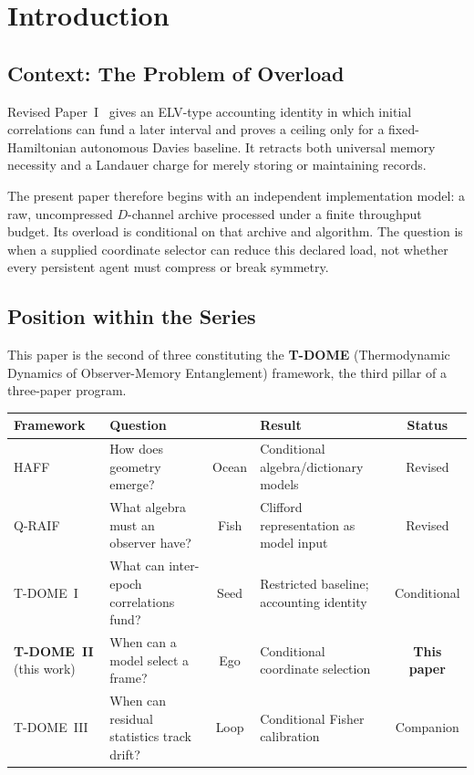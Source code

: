 \documentclass[12pt,a4paper,openany]{book}
\begin{document}
\section{Introduction}
\label{II-sec:intro}

\subsection{Context: The Problem of Overload}
\label{II-subsec:overload}

Revised Paper~I~\cite{Liu2026TDOME_I} gives an ELV-type
accounting identity in which initial correlations can fund a later
interval and proves a ceiling only for a fixed-Hamiltonian autonomous
Davies baseline.  It retracts both universal memory necessity and a
Landauer charge for merely storing or maintaining records.

The present paper therefore begins with an independent implementation
model: a raw, uncompressed $D$-channel archive processed under a finite
throughput budget.  Its overload is conditional on that archive and
algorithm.  The question is when a supplied coordinate selector can
reduce this declared load, not whether every persistent agent must
compress or break symmetry.

\subsection{Position within the Series}
\label{II-subsec:series_position}

This paper is the second of three constituting the
\textbf{T-DOME} (Thermodynamic Dynamics of Observer-Memory
Entanglement) framework, the third pillar of a three-paper
program.

\begin{center}
\small
\setlength{\tabcolsep}{4pt}%
\begin{tabular}{@{}lP{3.2cm}cP{3.4cm}c@{}}
\toprule
\textbf{Framework} & \textbf{Question} & & \textbf{Result}
  & \textbf{Status} \\
\midrule
HAFF~\cite{Liu2026HAFF_A,Liu2026HAFF_B}
  & How does geometry emerge?
  & Ocean
  & Conditional algebra/dictionary models
  & Revised \\[3pt]
Q-RAIF~\cite{Liu2026QRAIF_A,Liu2026QRAIF_B}
  & What algebra must an observer have?
  & Fish
  & Clifford representation as model input
  & Revised \\[3pt]
T-DOME~I~\cite{Liu2026TDOME_I}
  & What can inter-epoch correlations fund?
  & Seed
  & Restricted baseline; accounting identity
  & Conditional \\[3pt]
\textbf{T-DOME~II} (this work)
  & When can a model select a frame?
  & Ego
  & Conditional coordinate selection
  & \textbf{This paper} \\[3pt]
T-DOME~III
  & When can residual statistics track drift?
  & Loop
  & Conditional Fisher calibration
  & Companion \\
\bottomrule
\end{tabular}
\end{center}
\end{document}
